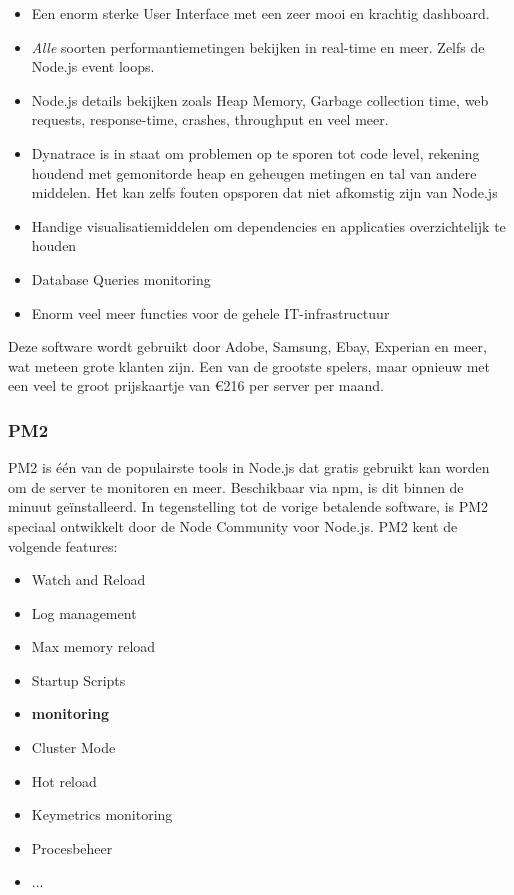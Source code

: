 \begin{itemize}
	\item Een enorm sterke User Interface met een zeer mooi en krachtig dashboard.
	\item \textit{Alle} soorten performantiemetingen bekijken in real-time en meer. Zelfs de Node.js event loops.
	\item Node.js details bekijken zoals Heap Memory, Garbage collection time, web requests, response-time, crashes, throughput en veel meer.
	\item Dynatrace is in staat om problemen op te sporen tot code level, rekening houdend met gemonitorde heap en geheugen metingen en tal van andere middelen. Het kan zelfs fouten opsporen dat niet afkomstig zijn van Node.js
	\item Handige visualisatiemiddelen om dependencies en applicaties overzichtelijk te houden
	\item Database Queries monitoring
	\item Enorm veel meer functies voor de gehele IT-infrastructuur
\end{itemize}

Deze software wordt gebruikt door Adobe, Samsung, Ebay, Experian en meer, wat meteen grote klanten zijn. Een van de grootste spelers, maar opnieuw met een veel te groot prijskaartje van \euro216 per server per maand.

\subsubsection{PM2}
\label{sec:pm2}

PM2 is één van de populairste tools in Node.js dat gratis gebruikt kan worden om de server te monitoren en meer. Beschikbaar via npm, is dit binnen de minuut geïnstalleerd. In tegenstelling tot de vorige betalende software, is PM2 speciaal ontwikkelt door de Node Community voor Node.js. PM2 kent de volgende features:

\begin{itemize}
	\item Watch and Reload
	\item Log management
	\item Max memory reload
	\item Startup Scripts
	\item \textbf{monitoring}
	\item Cluster Mode
	\item Hot reload
	\item Keymetrics monitoring
	\item Procesbeheer
	\item ...
\end{itemize}

